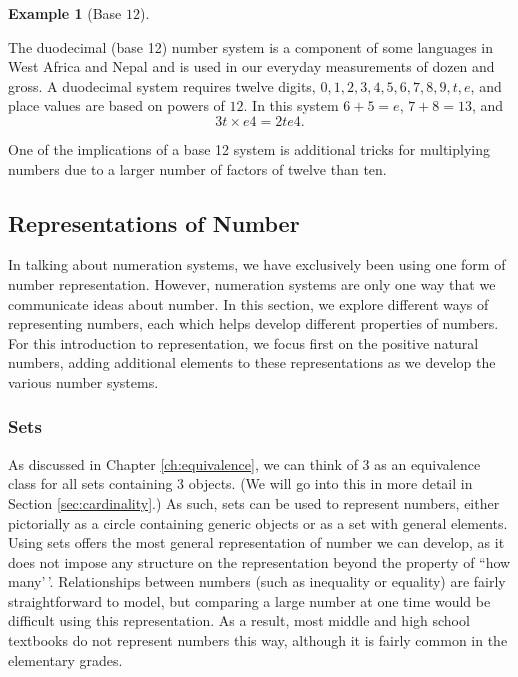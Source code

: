 \documentclass[
]{book}
\theoremstyle{definition}
\theoremstyle{definition}
\newtheorem{example}{Example}[chapter]
\theoremstyle{definition}
\theoremstyle{definition}
\theoremstyle{remark}
\begin{document}
\begin{example}[Base $12$]
\protect\hypertarget{exm:unlabeled-div-41}{}\label{exm:unlabeled-div-41}

The duodecimal (base 12) number system is a component of some languages in West Africa and Nepal and is used in our everyday measurements of dozen and gross. A duodecimal system requires twelve digits, \(0,1,2,3,4,5,6,7,8,9,t,e\), and place values are based on powers of \(12\). In this system \(6+5=e\), \(7+8=13\), and
\[3t \times e4 = 2te4.\]

One of the implications of a base 12 system is additional tricks for multiplying numbers due to a larger number of factors of twelve than ten.

\end{example}

\hypertarget{representations-of-number}{%
\subsection{Representations of Number}\label{representations-of-number}}

In talking about numeration systems, we have exclusively been using one form of number representation. However, numeration systems are only one way that we communicate ideas about number. In this section, we explore different ways of representing numbers, each which helps develop different properties of numbers. For this introduction to representation, we focus first on the positive natural numbers, adding additional elements to these representations as we develop the various number systems.

\hypertarget{sets}{%
\subsubsection*{Sets}\label{sets}}

As discussed in Chapter \ref{ch:equivalence}, we can think of 3 as an equivalence class for all sets containing 3 objects. (We will go into this in more detail in Section \ref{sec:cardinality}.) As such, sets can be used to represent numbers, either pictorially as a circle containing generic objects or as a set with general elements. Using sets offers the most general representation of number we can develop, as it does not impose any structure on the representation beyond the property of ``how many'\,'. Relationships between numbers (such as inequality or equality) are fairly straightforward to model, but comparing a large number at one time would be difficult using this representation. As a result, most middle and high school textbooks do not represent numbers this way, although it is fairly common in the elementary grades.
\end{document}
